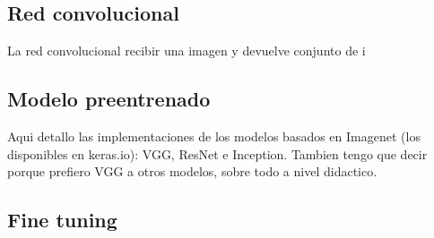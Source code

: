 \subsection{Red convolucional}

La red convolucional recibir una imagen y devuelve conjunto de i 

\subsection{Modelo preentrenado}

Aqui detallo las implementaciones de los modelos basados en Imagenet (los
disponibles en keras.io): VGG, ResNet e Inception. Tambien tengo que decir
porque prefiero VGG a otros modelos, sobre todo a nivel didactico.

\subsection{Fine tuning}
